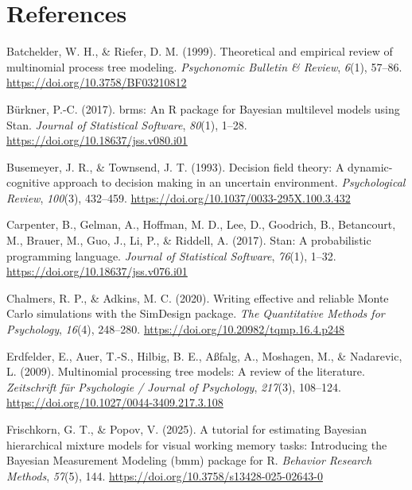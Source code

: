 \documentclass[
  man,
  floatsintext,
  longtable,
  nolmodern,
  notxfonts,
  notimes,
  colorlinks=true,linkcolor=blue,citecolor=blue,urlcolor=blue]{apa7}
\newlength{\cslhangindent}
\newenvironment{CSLReferences}[2] %
 {\begin{list}{}{%
  \setlength{\itemindent}{0pt}
  \setlength{\leftmargin}{0pt}
  \setlength{\parsep}{0pt}
  \ifodd #1
   \setlength{\leftmargin}{\cslhangindent}
   \setlength{\itemindent}{-1\cslhangindent}
  \fi
  \setlength{\itemsep}{#2\baselineskip}}}
 {\end{list}}
\begin{document}
\newpage

\section*{References}\label{references}

\label{refs}
\begin{CSLReferences}{1}{0}
Batchelder, W. H., \& Riefer, D. M. (1999). Theoretical and empirical
review of multinomial process tree modeling. \emph{Psychonomic Bulletin
\& Review}, \emph{6}(1), 57--86.
\url{https://doi.org/10.3758/BF03210812}

Bürkner, P.-C. (2017). {brms}: {A}n {R} package for {B}ayesian
multilevel models using {S}tan. \emph{Journal of Statistical Software},
\emph{80}(1), 1--28. \url{https://doi.org/10.18637/jss.v080.i01}

Busemeyer, J. R., \& Townsend, J. T. (1993). Decision field theory: {A}
dynamic-cognitive approach to decision making in an uncertain
environment. \emph{Psychological Review}, \emph{100}(3), 432--459.
\url{https://doi.org/10.1037/0033-295X.100.3.432}

Carpenter, B., Gelman, A., Hoffman, M. D., Lee, D., Goodrich, B.,
Betancourt, M., Brauer, M., Guo, J., Li, P., \& Riddell, A. (2017).
Stan: {A} probabilistic programming language. \emph{Journal of
Statistical Software}, \emph{76}(1), 1--32.
\url{https://doi.org/10.18637/jss.v076.i01}

Chalmers, R. P., \& Adkins, M. C. (2020). Writing effective and reliable
{M}onte {C}arlo simulations with the {SimDesign} package. \emph{The
Quantitative Methods for Psychology}, \emph{16}(4), 248--280.
\url{https://doi.org/10.20982/tqmp.16.4.p248}

Erdfelder, E., Auer, T.-S., Hilbig, B. E., Aßfalg, A., Moshagen, M., \&
Nadarevic, L. (2009). Multinomial processing tree models: {A} review of
the literature. \emph{Zeitschrift f{ü}r Psychologie / Journal of
Psychology}, \emph{217}(3), 108--124.
\url{https://doi.org/10.1027/0044-3409.217.3.108}

Frischkorn, G. T., \& Popov, V. (2025). A tutorial for estimating
{B}ayesian hierarchical mixture models for visual working memory tasks:
{I}ntroducing the {B}ayesian {M}easurement {M}odeling (bmm) package for
{R}. \emph{Behavior Research Methods}, \emph{57}(5), 144.
\url{https://doi.org/10.3758/s13428-025-02643-0}


\end{CSLReferences}
\end{document}
